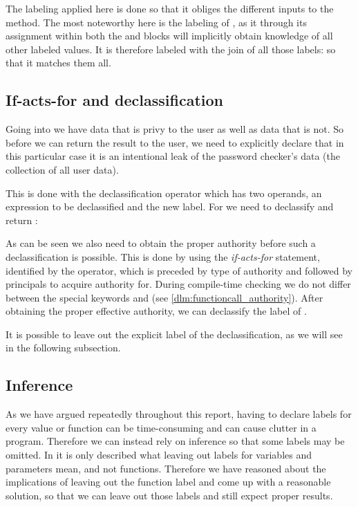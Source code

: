 The labeling applied here is done so that it obliges the different inputs to the method.
The most noteworthy here is the labeling of , as it through its assignment within both the  and  blocks will implicitly obtain knowledge of all other labeled values.
It is therefore labeled with the join of all those labels:  so that it matches them all.

\subsection{If-acts-for and declassification}\label{ctif:informal:ifactsfor_declassify}
Going into  we have data that is privy to the user as well as data that is not.
So before we can return the result to the user, we need to explicitly declare that in this particular case it is an intentional leak of the password checker's data (the collection of all user data).

This is done with the declassification operator \dlmc{<| |>} which has two operands, an expression to be declassified and the new label.
For  we need to declassify and return :\\
\begin{minipage}{\linewidth}

\end{minipage}

As can be seen we also need to obtain the proper authority before such a declassification is possible.
This is done by using the \emph{if-acts-for} statement, identified by the  operator, which is preceded by type of authority and followed by principals to acquire authority for.
During compile-time checking we do not differ between the special keywords  and  (see \cref{dlm:functioncall_authority}).
After obtaining the proper effective authority, we can declassify the label of .

It is possible to leave out the explicit label of the declassification, as we will see in the following subsection.

\subsection{Inference}\label{ctif:informal:inference}
As we have argued repeatedly throughout this report, having to declare labels for every value or function can be time-consuming and can cause clutter in a program.
Therefore we can instead rely on inference so that some labels may be omitted.
In \cite{myers1997} it is only described what leaving out labels for variables and parameters mean, and not functions.
Therefore we have reasoned about the implications of leaving out the function label and come up with a reasonable solution, so that we can leave out those labels and still expect proper results.

